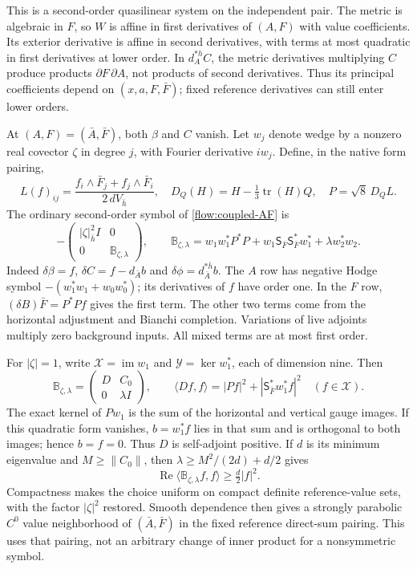 \documentclass[11pt]{article}
\numberwithin{equation}{section}
\theoremstyle{definition}
\theoremstyle{remark}
\begin{document}
This is a second-order quasilinear system on the independent pair.
The metric is algebraic in $F$, so $W$ is affine in first
derivatives of $(A,F)$ with value coefficients. Its exterior
derivative is affine in second derivatives, with terms at most
quadratic in first derivatives at lower order. In $d_A^{*h}C$,
the metric derivatives multiplying $C$ produce products
$\partial F\,\partial A$, not products of second derivatives.
Thus its principal coefficients depend on $(x,a,F,\bar F)$;
fixed reference derivatives can still enter lower orders.

At $(A,F)=(\bar A,\bar F)$, both $\beta$ and $C$ vanish.
Let $w_j$ denote wedge by a nonzero real covector $\zeta$ in
degree $j$, with Fourier derivative $iw_j$.
Define, in the native form pairing,
\[
 L(f)_{ij}=\frac{f_i\wedge\bar F_j+f_j\wedge\bar F_i}
                      {2\,dV_{\bar h}},\quad
 D_Q(H)=H-\tfrac13\operatorname{tr}(H)Q,\quad
 P=\sqrt8\,D_QL .
\]
The ordinary second-order symbol of \eqref{flow:coupled-AF} is
\begin{equation}\label{eq:coupled-symbol}
 -\begin{pmatrix}|\zeta|_{\bar h}^2I&0\\0&\mathbb B_{\zeta,\lambda}\end{pmatrix},
 \qquad
 \mathbb B_{\zeta,\lambda}
 =w_1w_1^*P^*P+
   w_1\mathsf S_{\bar F}\mathsf S_{\bar F}^*w_1^*
   +\lambda w_2^*w_2 .
\end{equation}
Indeed $\delta\beta=f$, $\delta C=f-d_{\bar A}b$ and
$\delta\phi=d_{\bar A}^{*\bar h}b$. The $A$ row has negative
Hodge symbol $-(w_1^*w_1+w_0w_0^*)$; its derivatives of $f$
have order one. In the $F$ row,
$(\delta B)\bar F=P^*Pf$ gives the first term.
The other two terms come from the horizontal adjustment and
Bianchi completion. Variations of live adjoints multiply zero
background inputs. All mixed terms are at most first order.

For $|\zeta|=1$, write
$\mathcal X=\operatorname{im}w_1$ and $\mathcal Y=\ker w_1^*$,
each of dimension nine. Then
\[
 \mathbb B_{\zeta,\lambda}
 =\begin{pmatrix}D&C_0\\0&\lambda I\end{pmatrix},\qquad
 \langle Df,f\rangle=|Pf|^2+
                  |\mathsf S_{\bar F}^*w_1^*f|^2
 \quad(f\in\mathcal X).
\]
The exact kernel of $Pw_1$ is the sum of the horizontal and
vertical gauge images. If this quadratic form vanishes,
$b=w_1^*f$ lies in that sum and is orthogonal to both images;
hence $b=f=0$. Thus $D$ is self-adjoint positive.
If $d$ is its minimum eigenvalue and $M\ge\|C_0\|$, then
$\lambda\ge M^2/(2d)+d/2$ gives
\[
 \operatorname{Re}\langle\mathbb B_{\zeta,\lambda}f,f\rangle
      \ge \tfrac d2|f|^2 .
\]
Compactness makes the choice uniform on compact definite
reference-value sets, with the factor $|\zeta|^2$ restored.
Smooth dependence then gives a strongly parabolic $C^0$
value neighborhood of $(\bar A,\bar F)$ in the fixed reference
direct-sum pairing. This uses that pairing, not an arbitrary
change of inner product for a nonsymmetric symbol.
\end{document}
